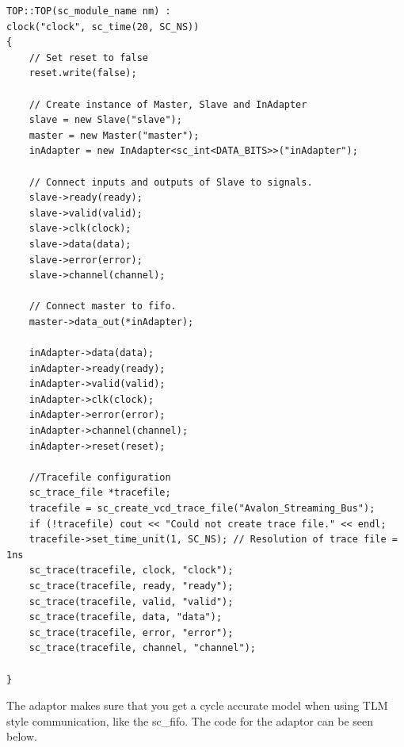 \begin{lstlisting}
TOP::TOP(sc_module_name nm) :
clock("clock", sc_time(20, SC_NS))
{
	// Set reset to false
	reset.write(false);
	
	// Create instance of Master, Slave and InAdapter
	slave = new Slave("slave");
	master = new Master("master");
	inAdapter = new InAdapter<sc_int<DATA_BITS>>("inAdapter");
	
	// Connect inputs and outputs of Slave to signals.
	slave->ready(ready);
	slave->valid(valid);
	slave->clk(clock);
	slave->data(data);
	slave->error(error);
	slave->channel(channel);
	
	// Connect master to fifo.
	master->data_out(*inAdapter);
	
	inAdapter->data(data);
	inAdapter->ready(ready);
	inAdapter->valid(valid);
	inAdapter->clk(clock);
	inAdapter->error(error);
	inAdapter->channel(channel);
	inAdapter->reset(reset);
	
	//Tracefile configuration
	sc_trace_file *tracefile;
	tracefile = sc_create_vcd_trace_file("Avalon_Streaming_Bus");
	if (!tracefile) cout << "Could not create trace file." << endl;
	tracefile->set_time_unit(1, SC_NS); // Resolution of trace file = 1ns
	sc_trace(tracefile, clock, "clock");
	sc_trace(tracefile, ready, "ready");
	sc_trace(tracefile, valid, "valid");
	sc_trace(tracefile, data, "data");
	sc_trace(tracefile, error, "error");
	sc_trace(tracefile, channel, "channel");

}
\end{lstlisting}


The adaptor makes sure that you get a cycle accurate model when using TLM style communication, like the sc\_fifo. The code for the adaptor can be seen below.

